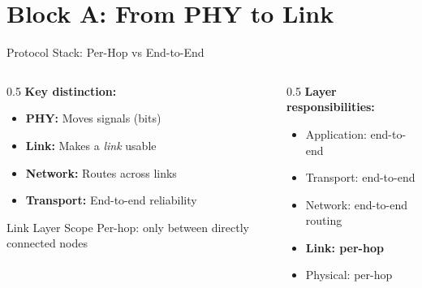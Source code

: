 \documentclass[aspectratio=169,11pt]{beamer}
\begin{document}
\section{Block A: From PHY to Link}

\begin{frame}{Protocol Stack: Per-Hop vs End-to-End}
    \begin{columns}[T]
        \begin{column}{0.5\textwidth}
            \textbf{Key distinction:}
            \begin{itemize}
                \item \textbf{PHY:} Moves signals (bits)
                \item \textbf{Link:} Makes a \emph{link} usable
                \item \textbf{Network:} Routes across links
                \item \textbf{Transport:} End-to-end reliability
            \end{itemize}
            
            \vspace{0.3cm}
            \begin{alertblock}{Link Layer Scope}
                Per-hop: only between directly connected nodes
            \end{alertblock}
        \end{column}
        \begin{column}{0.5\textwidth}
            \textbf{Layer responsibilities:}
            \begin{itemize}
                \item Application: end-to-end
                \item Transport: end-to-end
                \item Network: end-to-end routing
                \item \textbf{Link: per-hop}
                \item Physical: per-hop
            \end{itemize}
        \end{column}
    \end{columns}
\end{frame}
\end{document}

